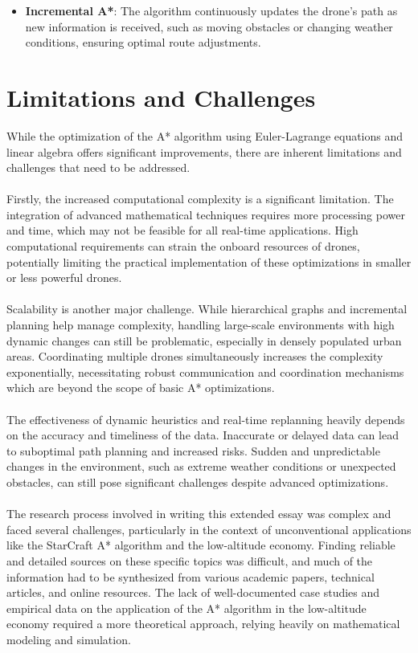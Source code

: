 \documentclass[12pt]{article}
\begin{document}
\begin{itemize}
    \item \textbf{Incremental A*}: The algorithm continuously updates the drone's path as new information is received, such as moving obstacles or changing weather conditions, ensuring optimal route adjustments.
\end{itemize}
\newpage
\section{Limitations and Challenges}
While the optimization of the A* algorithm using Euler-Lagrange equations and linear algebra offers significant improvements, there are inherent limitations and challenges that need to be addressed.
\\\\
Firstly, the increased computational complexity is a significant limitation. The integration of advanced mathematical techniques requires more processing power and time, which may not be feasible for all real-time applications. High computational requirements can strain the onboard resources of drones, potentially limiting the practical implementation of these optimizations in smaller or less powerful drones. 
\\\\
Scalability is another major challenge. While hierarchical graphs and incremental planning help manage complexity, handling large-scale environments with high dynamic changes can still be problematic, especially in densely populated urban areas. Coordinating multiple drones simultaneously increases the complexity exponentially, necessitating robust communication and coordination mechanisms which are beyond the scope of basic A* optimizations.
\\\\
The effectiveness of dynamic heuristics and real-time replanning heavily depends on the accuracy and timeliness of the data. Inaccurate or delayed data can lead to suboptimal path planning and increased risks. Sudden and unpredictable changes in the environment, such as extreme weather conditions or unexpected obstacles, can still pose significant challenges despite advanced optimizations.
\\\\
The research process involved in writing this extended essay was complex and faced several challenges, particularly in the context of unconventional applications like the StarCraft A* algorithm and the low-altitude economy. Finding reliable and detailed sources on these specific topics was difficult, and much of the information had to be synthesized from various academic papers, technical articles, and online resources. The lack of well-documented case studies and empirical data on the application of the A* algorithm in the low-altitude economy required a more theoretical approach, relying heavily on mathematical modeling and simulation.
\end{document}
